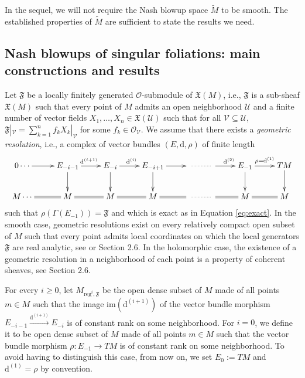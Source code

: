 \documentclass[10pt]{article}
\theoremstyle{plain}
\theoremstyle{definition}
\theoremstyle{remark}
\newcommand{\dd}{\mathrm{d}}
\begin{document}
In the sequel, we will not require the Nash blowup space $\widetilde M$ to be smooth. The established properties of $\widetilde M$ are sufficient to state the results we need.

\subsection{Nash blowups of singular foliations: main constructions and results}\label{Nash-foliations} Let $\mathfrak F$ be  a locally  finitely generated $\mathcal{O}$-submodule of $\mathfrak{X}(M)$, i.e., $\mathfrak F$ is a sub-sheaf $\mathfrak{X}(M)$ such that every point of $M$ admits an open neighborhood $\mathcal{U}$ and a finite number of vector fields $X_1,\ldots, X_n \in \mathfrak{X}(\mathcal U)$ such that for all $\mathcal V\subseteq \mathcal{U}$,  $\mathfrak{F}|_\mathcal{\mathcal{V}}=\sum_{k=1}^nf_kX_k|_{\mathcal{V}}$ for some $f_k\in \mathcal{O}_{\mathcal{V}}$. We assume that there exists a \emph{geometric resolution}, i.e.,  a complex of vector bundles $(E, \dd,\rho)$ of finite length \begin{equation}
    \label{eq:resolutions2}
  \xymatrix{ 0\cdots \ar[r] & E_{-i-1} \ar[r]^{{\dd^{(i+1)}}} \ar[d] & 
     E_{ -i} \ar[r]^{{\dd^{(i)}}}
     \ar[d] & E_{-i+1} \ar[r] \ar[d] & \ar@{..}[r] & \ar[r]^{{\dd^{(2)}}}& E_{-1} \ar[r]^{\rho=\dd^{(1)}} \ar[d]& TM \ar[d] \\M \cdots
      \ar@{=}[r] & \ar@{=}[r] M  &  \ar@{=}[r] M 
      &  \ar@{=}[r] M  &\ar@{..}[r] & \ar@{=}[r]   &  \ar@{=}[r] M  & M}
    \end{equation}
such that $\rho(\Gamma(E_{-1}))=\mathfrak{F}$ and which is exact as in Equation \eqref{eq:exact}. In the smooth case, geometric resolutions exist on every relatively compact open subset of $M$ such that every point admits local coordinates on which the local generators $\mathfrak F$ are real analytic, see \cite{LLS} or \cite{LLL} Section 2.6. In the holomorphic case, the existence of a geometric resolution in a neighborhood of each point is a property of coherent sheaves, see \cite{LLL} Section 2.6.


For every $i\geq 0$, let $M_{\mathrm{reg}^i,\mathfrak{F}}$
be the open dense subset of $M$ made of all points $ m \in M$ such that the image $\mathrm{im}(\dd^{(i+1)})$ of  the vector bundle morphism $E_{-i-1}\stackrel{\dd^{(i+1)}}{\longrightarrow}E_{-i}$  is of constant rank on some neighborhood. 
For $i=0$, we define it to be  open dense subset of $M$ made of all points $ m \in M$ such that the vector bundle morphism $\rho\colon E_{-1}\to TM$ is of constant rank on some neighborhood.
To avoid having to distinguish this case, from now on, we set $E_0:=TM$ and $\dd^{(1)}=\rho$  by convention.
\end{document}
